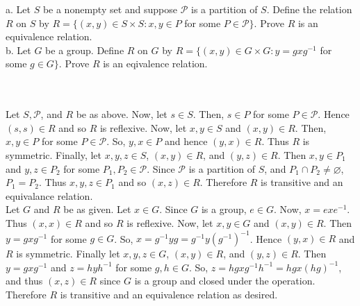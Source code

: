 a. Let $S$ be a nonempty set and suppose $\mathcal{P}$ is a partition of $S$. Define the relation $R$ on
$S$ by $R=\{(x,y)\in S\times S:x,y\in P$ for some $P\in\mathcal{P}\}$. Prove $R$ is an equivalence
relation.\\

b. Let $G$ be a group. Define $R$ on $G$ by $R=\{(x,y)\in G\times G:y=gxg^{-1}$ for some $g\in G\}$.
Prove $R$ is an eqivalence relation.\\\\

\begin{solution}\renewcommand{\qedsymbol}{}\ \\
    Let $S, \mathcal{P}$, and $R$ be as above. Now, let $s\in S$. Then, $s\in P$ for some
    $P\in\mathcal{P}$. Hence $(s,s)\in R$ and so $R$ is reflexive. Now, let $x,y\in S$ and $(x,y)\in R$.
    Then, $x,y\in P$ for some $P\in\mathcal{P}$. So, $y,x\in P$ and hence $(y,x)\in R$. Thus $R$ is
    symmetric. Finally, let $x,y,z\in S$, $(x,y)\in R$, and $(y,z)\in R$. Then $x,y\in P_1$ and
    $y,z\in P_2$ for some $P_1,P_2\in\mathcal{P}$. Since $\mathcal{P}$ is a partition of $S$, and
    $P_1\cap P_2\neq\varnothing$, $P_1=P_2$. Thus $x,y,z\in P_1$ and so $(x,z)\in R$. Therefore $R$ is
    transitive and an equivalance relation.\\

    Let $G$ and $R$ be as given. Let $x\in G$. Since $G$ is a group, $e\in G$. Now, $x=exe^{-1}$. Thus
    $(x,x)\in R$ and so $R$ is reflexive. Now, let $x,y\in G$ and $(x,y)\in R$. Then $y=gxg^{-1}$ for
    some $g\in G$. So, $x=g^{-1}yg=g^{-1}y(g^{-1})^{-1}$. Hence $(y,x)\in R$ and $R$ is symmetric.
    Finally let $x,y,z\in G$, $(x,y)\in R$, and $(y,z)\in R$. Then $y=gxg^{-1}$ and $z=hyh^{-1}$ for
    some $g,h\in G$. So, $z=hgxg^{-1}h^{-1}=hgx(hg)^{-1}$, and thus $(x,z)\in R$ since $G$ is a group
    and closed under the operation. Therefore $R$ is transitive and an equivalence relation as desired.

\end{solution}